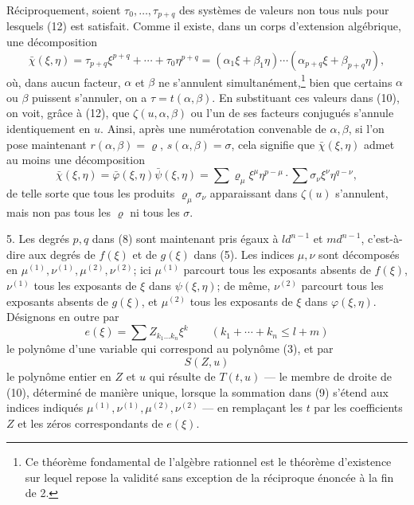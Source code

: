 \documentclass[11pt]{article}
\begin{document}
Réciproquement, soient $\tau_0,\ldots,\tau_{p+q}$ des systèmes de valeurs non tous nuls pour lesquels (12) est satisfait. Comme il existe, dans un corps d'extension algébrique, une décomposition
\begin{equation}
 \bar\chi(\xi,\eta)=\tau_{p+q}\xi^{p+q}+\cdots+\tau_0\eta^{p+q}
=(\alpha_1\xi+\beta_1\eta)\cdots(\alpha_{p+q}\xi+\beta_{p+q}\eta),
\tag{12}
\end{equation}
où, dans aucun facteur, $\alpha$ et $\beta$ ne s'annulent simultanément,\footnote{Ce \og théorème fondamental de l'algèbre \fg{} rationnel est le théorème d'existence sur lequel repose la validité sans exception de la réciproque énoncée à la fin de 2.} bien que certains $\alpha$ ou $\beta$ puissent s'annuler, on a $\tau=t(\alpha,\beta)$. En substituant ces valeurs dans (10), on voit, grâce à (12), que $\zeta(u,\alpha,\beta)$ ou l'un de ses facteurs conjugués s'annule identiquement en $u$. Ainsi, après une numérotation convenable de $\alpha,\beta$, si l'on pose maintenant $r(\alpha,\beta)=\varrho$, $s(\alpha,\beta)=\sigma$, cela signifie que $\bar\chi(\xi,\eta)$ admet au moins une décomposition
\begin{equation}
\bar\chi(\xi,\eta)=\bar\varphi(\xi,\eta)\bar\psi(\xi,\eta)
=\sum \varrho_\mu\xi^\mu\eta^{p-\mu}\cdot\sum \sigma_\nu\xi^\nu\eta^{q-\nu},
\tag{13}
\end{equation}
de telle sorte que tous les produits $\varrho_\mu\sigma_\nu$ apparaissant dans $\zeta(u)$ s'annulent, mais non pas tous les $\varrho$ ni tous les $\sigma$.

5. Les degrés $p,q$ dans (8) sont maintenant pris égaux à $ld^{n-1}$ et $md^{n-1}$, c'est-à-dire aux degrés de $f(\xi)$ et de $g(\xi)$ dans (5). Les indices $\mu,\nu$ sont décomposés en $\mu^{(1)},\nu^{(1)},\mu^{(2)},\nu^{(2)}$; ici $\mu^{(1)}$ parcourt tous les exposants absents de $f(\xi)$, $\nu^{(1)}$ tous les exposants de $\xi$ dans $\psi(\xi,\eta)$; de même, $\nu^{(2)}$ parcourt tous les exposants absents de $g(\xi)$, et $\mu^{(2)}$ tous les exposants de $\xi$ dans $\varphi(\xi,\eta)$. Désignons en outre par
\[
 e(\xi)=\sum Z_{k_1\ldots k_n}\xi^k\qquad(k_1+\cdots+k_n\le l+m)
\]
le polynôme d'une variable qui correspond au polynôme (3), et par
\[
 S(Z,u)
\]
le polynôme entier en $Z$ et $u$ qui résulte de $T(t,u)$ --- le membre de droite de (10), déterminé de manière unique, lorsque la sommation dans (9) s'étend aux indices indiqués $\mu^{(1)},\nu^{(1)},\mu^{(2)},\nu^{(2)}$ --- en remplaçant les $t$ par les coefficients $Z$ et les zéros correspondants de $e(\xi)$.
\end{document}
